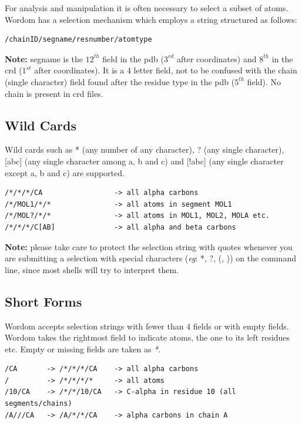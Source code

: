 \documentclass[11pt,twoside,onecolumn,a4paper,openright,notitlepage]{book}[2001/04/21]
\begin{document}
For analysis and manipulation it is often necessary to select a subset of atoms. Wordom has a selection mechanism which employs a string structured as follows:
\begin{verbatim}
/chainID/segname/resnumber/atomtype
\end{verbatim}
{\bf Note:} segname is the $12^{th}$ field in the pdb ($3^{rd}$ after coordinates) and $8^{th}$ in the crd ($1^{st}$ after coordinates). It is a 4 letter field, not to be confused with the chain (single character) field found after the residue type in the pdb ($5^{th}$ field). No chain is present in crd files.

\subsection{Wild Cards}
Wild cards such as * (any number of any character), ? (any single character), [abc] (any single character among a, b and c) and [!abc] (any single character except a, b and c) are supported.
\begin{verbatim}
/*/*/*/CA                 -> all alpha carbons
/*/MOL1/*/*               -> all atoms in segment MOL1
/*/MOL?/*/*               -> all atoms in MOL1, MOL2, MOLA etc.
/*/*/*/C[AB]              -> all alpha and beta carbons
\end{verbatim}
{\bf Note:} please take care to protect the selection string with quotes whenever you are submitting a selection with special characters (\emph{eg}: *, ?, (, )) on the command line, since most shells will try to interpret them.

\subsection{Short Forms}
Wordom accepts selection strings with fewer than 4 fields or with empty fields. Wordom takes the rightmost field to indicate atoms, the one to its left residues etc. Empty or missing fields are taken as \emph{*}.
\begin{verbatim}
/CA       -> /*/*/*/CA    -> all alpha carbons
/         -> /*/*/*/*     -> all atoms
/10/CA    -> /*/*/10/CA   -> C-alpha in residue 10 (all segments/chains)
/A///CA   -> /A/*/*/CA    -> alpha carbons in chain A
\end{verbatim}
\end{document}
